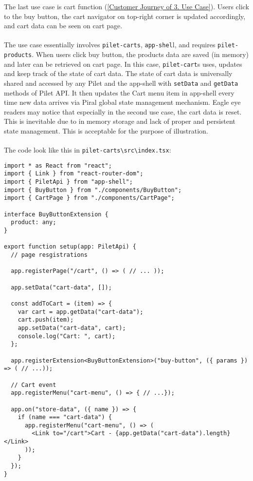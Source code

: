 \documentclass[a4paper]{book}
\begin{document}
The last use case is cart function (\ref{Customer Journey of 3. Use Case}). Users click to the buy button, the cart navigator on top-right corner is updated accordingly, and cart data can be seen on cart page.
\\ \\ 
The use case essentially involves \verb|pilet-carts|, \verb|app-shel|l, and requires \verb|pilet-products|. When users click buy button, the products data are saved (in memory) and later can be retrieved on cart page. In this case, \verb|pilet-cart|s uses, updates and keep track of the state of cart data. The state of cart data is universally shared and accessed by any Pilet and the app-shell with \verb|setData| and \verb|getData| methods of Pilet API. It then updates the Cart menu item in app-shell every time new data arrives via Piral global state management mechanism. Eagle eye readers may notice that especially in the second use case, the cart data is reset. This is inevitable due to in memory storage and lack of proper and persistent state management. This is acceptable for the purpose of illustration.
\\ \\
The code look like this in \verb|pilet-carts\src\index.tsx|:
\begin{lstlisting}[caption={pilet-carts handles cart data}]
import * as React from "react";
import { Link } from "react-router-dom";
import { PiletApi } from "app-shell";
import { BuyButton } from "./components/BuyButton";
import { CartPage } from "./components/CartPage";

interface BuyButtonExtension {
  product: any;
}

export function setup(app: PiletApi) {
  // page resgistrations

  app.registerPage("/cart", () => ( // ... ));

  app.setData("cart-data", []);

  const addToCart = (item) => {
    var cart = app.getData("cart-data");
    cart.push(item);
    app.setData("cart-data", cart);
    console.log("Cart: ", cart);
  };

  app.registerExtension<BuyButtonExtension>("buy-button", ({ params }) => ( // ...));

  // Cart event
  app.registerMenu("cart-menu", () => { // ...});

  app.on("store-data", ({ name }) => {
    if (name === "cart-data") {
      app.registerMenu("cart-menu", () => (
        <Link to="/cart">Cart - {app.getData("cart-data").length} </Link>
      ));
    }
  });
}

\end{lstlisting}
\end{document}
